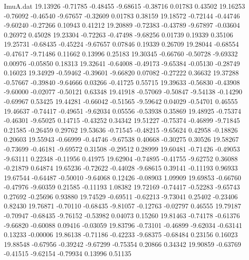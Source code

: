 \begin{filecontents}{ImuA.dat}
  19.13926   -0.71785   -0.48455   -9.68615   -0.38716    0.01783    0.43502
  19.16253   -0.76092   -0.46540   -9.67657   -0.32609    0.01783    0.38159
  19.18572   -0.72144   -0.44746   -9.60240   -0.27266    0.10943    0.41212
  19.20889   -0.72383   -0.43789   -9.67897   -0.03604    0.26972    0.45028
  19.23304   -0.72263   -0.47498   -9.68256    0.01739    0.19339    0.35106
  19.25731   -0.68435   -0.45224   -9.67657    0.07846    0.19339    0.26709
  19.28044   -0.68554   -0.47617   -9.71486    0.11662    0.13996    0.25183
  19.30345   -0.66760   -0.50728   -9.69332    0.00976   -0.05850    0.18313
  19.32641   -0.64008   -0.49173   -9.65384   -0.05130   -0.28749    0.16023
  19.34929   -0.59462   -0.39601   -9.66820    0.07082   -0.27222    0.36632
  19.37288   -0.57667   -0.39840   -9.64666    0.03266   -0.41725    0.55715
  19.39633   -0.56830   -0.43908   -9.60000   -0.02077   -0.50121    0.63348
  19.41918   -0.57069   -0.50847   -9.54138   -0.14290   -0.69967    0.53425
  19.44281   -0.66042   -0.51565   -9.59642    0.04029   -0.54701    0.46555
  19.46637   -0.74417   -0.49651   -9.62034    0.05556   -0.53938    0.35869
  19.48925   -0.75374   -0.46301   -9.65025    0.14715   -0.43252    0.34342
  19.51227   -0.75374   -0.46899   -9.71845    0.21585   -0.26459    0.29762
  19.53636   -0.71545   -0.48215   -9.65624    0.42958   -0.18826    0.20603
  19.55943   -0.66999   -0.44746   -9.67538    0.40668   -0.30275    0.30526
  19.58267   -0.73699   -0.46181   -9.69572    0.31508   -0.29512    0.28999
  19.60481   -0.71426   -0.49053   -9.63111    0.22348   -0.11956    0.41975
  19.62904   -0.74895   -0.41755   -9.62752    0.36088   -0.21879    0.64874
  19.65236   -0.72622   -0.44028   -9.68615    0.39141   -0.11193    0.96933
  19.67544   -0.64487   -0.50010   -9.64068    0.12426   -0.08903    1.09909
  19.69853   -0.66760   -0.47976   -9.60359    0.21585   -0.11193    1.08382
  19.72169   -0.74417   -0.52283   -9.65743    0.27692   -0.25696    0.93880
  19.74529   -0.69511   -0.62213   -9.73041    0.25402   -0.23406    0.82430
  19.76871   -0.70110   -0.68435   -9.81057   -0.12763   -0.02797    0.46555
  19.79187   -0.70947   -0.68435   -9.76152   -0.53982    0.04073    0.15260
  19.81463   -0.74178   -0.61376   -9.66820   -0.60088    0.09416   -0.03059
  19.83796   -0.73101   -0.46899   -9.62034   -0.63141    0.13233   -0.00006
  19.86138   -0.71186   -0.42233   -9.68375   -0.68484    0.23156    0.16023
  19.88548   -0.67956   -0.39242   -9.67299   -0.75354    0.20866    0.34342
  19.90859   -0.63769   -0.41515   -9.62154   -0.79934    0.13996    0.51135

\end{filecontents}
